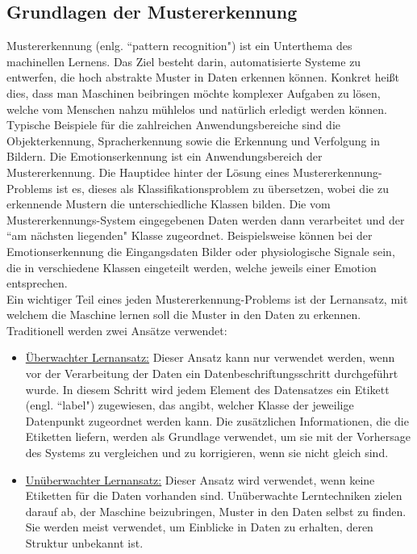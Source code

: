 \subsection{Grundlagen der Mustererkennung} \label{grundlagen-mustererkennung-subsec}


Mustererkennung (enlg. ``pattern recognition") ist ein Unterthema des machinellen Lernens.
Das Ziel besteht darin, automatisierte Systeme zu entwerfen, die hoch abstrakte Muster in Daten erkennen können.
Konkret heißt dies, dass man Maschinen beibringen möchte komplexer Aufgaben zu lösen, welche vom Menschen nahzu mühlelos und natürlich erledigt werden können.
Typische Beispiele für die zahlreichen Anwendungsbereiche sind die Objekterkennung, Spracherkennung sowie die Erkennung und Verfolgung in Bildern. 
Die Emotionserkennung ist ein Anwendungsbereich der Mustererkennung.
Die Hauptidee hinter der Lösung eines Mustererkennung-Problems ist es, dieses als Klassifikationsproblem zu übersetzen, wobei die zu erkennende Mustern die unterschiedliche Klassen bilden. 
Die vom Mustererkennungs-System eingegebenen Daten werden dann verarbeitet und der ``am nächsten liegenden" Klasse zugeordnet.
Beispielsweise können bei der Emotionserkennung die Eingangsdaten Bilder oder physiologische Signale sein, die in verschiedene Klassen eingeteilt werden, welche jeweils einer Emotion entsprechen. \\

Ein wichtiger Teil eines jeden Mustererkennung-Problems ist der Lernansatz, mit welchem die Maschine lernen soll die Muster in den Daten zu erkennen. 
Traditionell werden zwei Ansätze verwendet:

\begin{itemize}%
  \item \underline{Überwachter Lernansatz:}
  Dieser Ansatz kann nur verwendet werden, wenn vor der Verarbeitung der Daten ein Datenbeschriftungsschritt durchgeführt wurde.
  In diesem Schritt wird jedem Element des Datensatzes ein Etikett (engl. ``label") zugewiesen, das angibt, welcher Klasse der jeweilige Datenpunkt zugeordnet werden kann.
  Die zusätzlichen Informationen, die die Etiketten liefern, werden als Grundlage verwendet, um sie mit der Vorhersage des Systems zu vergleichen und zu korrigieren, wenn sie nicht gleich sind.

  \item \underline{Unüberwachter Lernansatz:}
  Dieser Ansatz wird verwendet, wenn keine Etiketten für die Daten vorhanden sind.
  Unüberwachte Lerntechniken zielen darauf ab, der Maschine beizubringen, Muster in den Daten selbst zu finden. 
  Sie werden meist verwendet, um Einblicke in Daten zu erhalten, deren Struktur unbekannt ist.
\end{itemize} %


